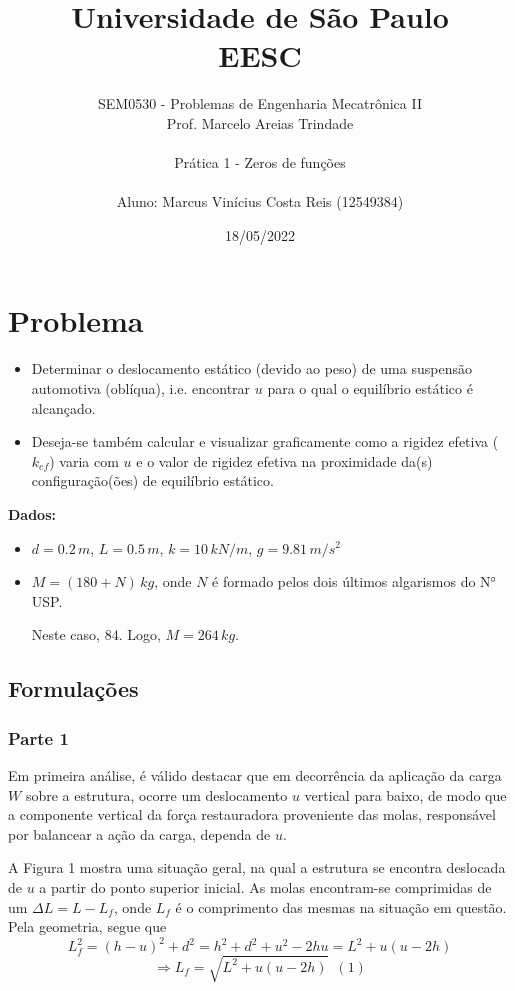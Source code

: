 \documentclass[a4paper, 12pt]{article}
\title{Universidade de São Paulo \\ EESC}
\author{SEM0530 - Problemas de Engenharia Mecatrônica II \\ 
Prof. Marcelo Areias Trindade \\ \\ Prática 1 - Zeros de funções
\\ \\ Aluno: Marcus Vinícius Costa Reis (12549384)}
\date{18/05/2022}
\begin{document}
	\maketitle \newpage \tableofcontents \newpage
	
	\section{Problema}
	
	\begin{itemize}
		\item Determinar o deslocamento estático (devido ao peso) de uma suspensão automotiva (oblíqua),
		i.e. encontrar $u$ para o qual o equilíbrio estático é alcançado.
		\item Deseja-se também calcular e visualizar graficamente como a rigidez efetiva ($k_{ef}$) varia com $u$ e o
		valor de rigidez efetiva na proximidade da(s) configuração(ões) de equilíbrio estático.	
	\end{itemize}
	
	\textbf{Dados:}
	
	\begin{itemize}
		\item $d=0.2\,m$, $L=0.5\,m$, $k=10\,kN/m$, $g=9.81\,m/s^2$
		\item $M=(180+N)\,kg$, onde $N$ é formado pelos dois últimos algarismos do N° USP.
		
		Neste caso, $84$. Logo, $M=264\,kg$.		
	\end{itemize}
	
	\subsection{Formulações}
	
	\subsubsection{Parte 1}
	
	Em primeira análise, é válido destacar que em decorrência da aplicação da carga $W$ sobre a estrutura, ocorre um 
	deslocamento $u$ vertical para baixo, de modo que a componente vertical da força restauradora proveniente das molas, 
	responsável por balancear a ação da carga, dependa de $u$.
	
	A Figura 1 mostra uma situação geral, na qual a estrutura se encontra deslocada de $u$ a partir do ponto superior 
	inicial. As molas encontram-se comprimidas de um $\Delta L=L-L_f$, onde $L_f$ é o comprimento das mesmas na situação 
	em questão. Pela geometria, segue que $$L_f^2=(h-u)^2+d^2=h^2+d^2+u^2-2hu=L^2+u(u-2h)$$
	$$\Longrightarrow L_f=\sqrt{L^2+u(u-2h)}\,\,\,(1)$$
	
\end{document}
